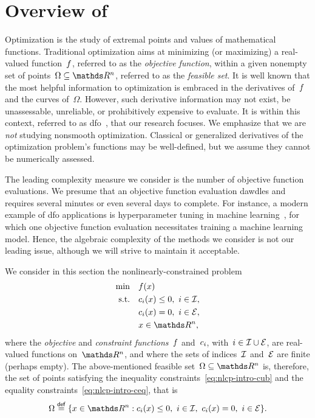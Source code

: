 \section{Overview of }

Optimization is the study of extremal points and values of mathematical functions.
Traditional optimization aims at minimizing (or maximizing) a real-valued function~$f$, referred to as the \emph{objective function}, within a given nonempty set of points~$\Omega \subseteq \R^n$, referred to as the \emph{feasible set}.
It is well known that the most helpful information to optimization is embraced in the derivatives of~$f$ and the curves of~$\Omega$.
However, such derivative information may not exist, be unassessable, unreliable, or prohibitively expensive to evaluate.
It is within this context, referred to as \gls{dfo}~\cite{Audet_Hare_2017,Conn_Scheinberg_Vicente_2009b}, that our research focuses.
We emphasize that we are \emph{not} studying nonsmooth optimization.
Classical or generalized derivatives of the optimization problem's functions may be well-defined, but we assume they cannot be numerically assessed.

The leading complexity measure we consider is the number of objective function evaluations.
We presume that an objective function evaluation dawdles and requires several minutes or even several days to complete.
For instance, a modern example of \gls{dfo} applications is hyperparameter tuning in machine learning~\cite{Ghanbari_Scheinberg_2017}, for which one objective function evaluation necessitates training a machine learning model.
Hence, the algebraic complexity of the methods we consider is not our leading issue, although we will strive to maintain it acceptable.

We consider in this section the nonlinearly-constrained problem
\begin{subequations}
    \label{eq:nlcp-intro}
    \begin{align}
        \min        & \quad \obj(x) \label{eq:nlcp-intro-obj}\\
        \text{s.t.} & \quad \con{i}(x) \le 0, ~ i \in \iub, \label{eq:nlcp-intro-cub}\\
                    & \quad \con{i}(x) = 0, ~ i \in \ieq, \label{eq:nlcp-intro-ceq}\\
                    & \quad x \in \R^n, \nonumber
    \end{align}
\end{subequations}
where the \emph{objective} and \emph{constraint functions}~$f$ and~$c_{i}$, with~$i \in \mathcal{I} \cup \mathcal{E}$, are real-valued functions on~$\R^n$, and where the sets of indices~$\mathcal{I}$ and~$\mathcal{E}$ are finite (perhaps empty).
The above-mentioned feasible set~$\Omega \subseteq \R^n$ is, therefore, the set of points satisfying the inequality constraints~\cref{eq:nlcp-intro-cub} and the equality constraints~\cref{eq:nlcp-intro-ceq}, that is
\begin{equation}
    \label{eq:omega-intro}
    \Omega \eqdef \set{x \in \R^n : \con{i}(x) \le 0, ~ i \in \iub, ~ \con{i}(x) = 0, ~ i \in \ieq}.
\end{equation}

